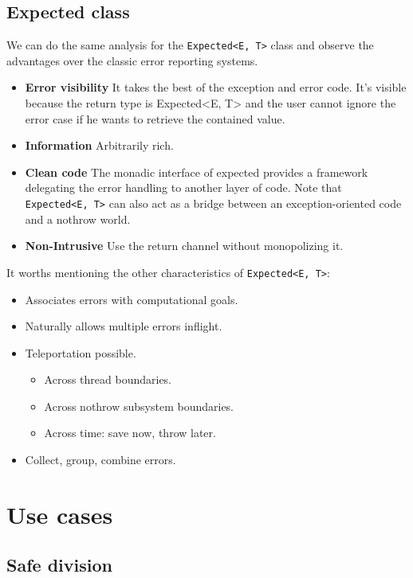 \documentclass[a4paper,10pt]{article}
\newcommand{\cpp}[1]{\lstinline{#1}}
\begin{document}
\subsection{Expected class}

We can do the same analysis for the \cpp{Expected<E, T>} class and observe the advantages over the classic error reporting systems.

\begin{itemize}
 \item \textbf{Error visibility} It takes the best of the exception and error code. It's visible because the return type is Expected<E, T> and the user cannot ignore the error case if he wants to retrieve the contained value.
 \item \textbf{Information} Arbitrarily rich.
 \item \textbf{Clean code} The monadic interface of expected provides a framework delegating the error handling to another layer of code. Note that \cpp{Expected<E, T>} can also act as a bridge between an exception-oriented code and a nothrow world.
 \item \textbf{Non-Intrusive} Use the return channel without monopolizing it.
\end{itemize}

\noindent
It worths mentioning the other characteristics of \cpp{Expected<E, T>}:

\begin{itemize}
 \item Associates errors with computational goals.
 \item Naturally allows multiple errors inflight.
 \item Teleportation possible.
 \begin{itemize}
  \item Across thread boundaries.
  \item Across nothrow subsystem boundaries.
  \item Across time: save now, throw later.
 \end{itemize}
 \item Collect, group, combine errors.
\end{itemize}

\section{Use cases}

\subsection{Safe division}
\label{divide-example}
\end{document}
